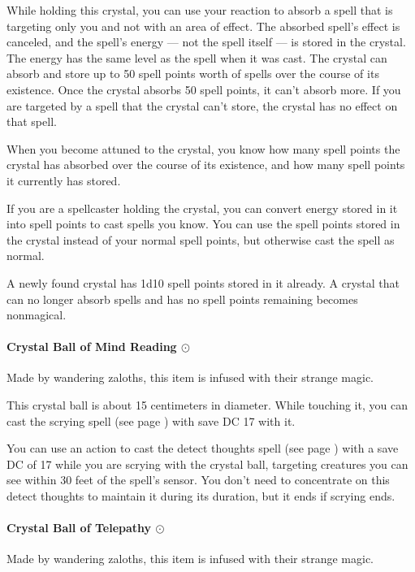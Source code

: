         While holding this crystal, you can use your reaction to absorb a spell that is targeting only you and not with an area of effect.
        The absorbed spell's effect is canceled, and the spell's energy --- not the spell itself --- is stored in the crystal.
        The energy has the same level as the spell when it was cast.
        The crystal can absorb and store up to 50 spell points worth of spells over the course of its existence.
        Once the crystal absorbs 50 spell points, it can't absorb more.
        If you are targeted by a spell that the crystal can't store, the crystal has no effect on that spell.

        When you become attuned to the crystal, you know how many spell points the crystal has absorbed over the course of its existence, and how many spell points it currently has stored.

        If you are a spellcaster holding the crystal, you can convert energy stored in it into spell points to cast spells you know.
        You can use the spell points stored in the crystal instead of your normal spell points, but otherwise cast the spell as normal.

        A newly found crystal has 1d10 spell points stored in it already.
        A crystal that can no longer absorb spells and has no spell points remaining becomes nonmagical.
    \paragraph{Crystal Ball of Mind Reading $\odot$}
        Made by wandering zaloths, this item is infused with their strange magic.

        This crystal ball is about 15 centimeters in diameter.
        While touching it, you can cast the scrying spell (see page \pageref{spell::scrying}) with save DC 17 with it.

        You can use an action to cast the detect thoughts spell (see page \pageref{spell::detectthoughts}) with a save DC of 17 while you are scrying with the crystal ball, targeting creatures you can see within 30 feet of the spell's sensor.
        You don't need to concentrate on this detect thoughts to maintain it during its duration, but it ends if scrying ends.
    \paragraph{Crystal Ball of Telepathy $\odot$}
        Made by wandering zaloths, this item is infused with their strange magic.

